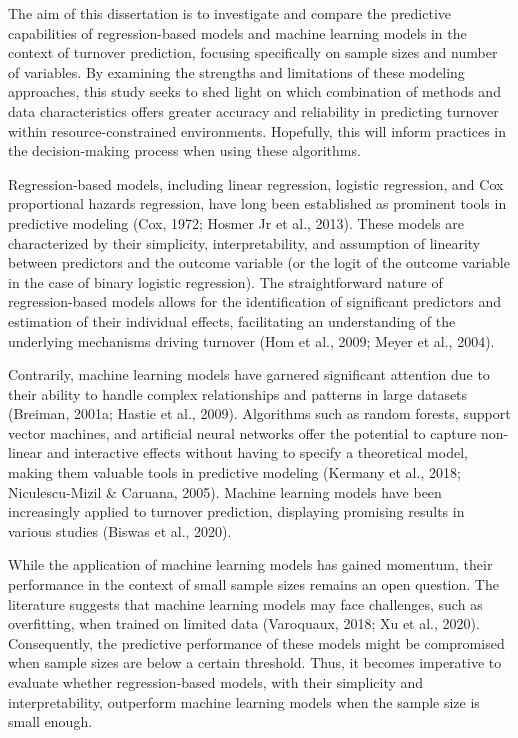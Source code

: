 \documentclass[
  man]{apa7}
\begin{document}
The aim of this dissertation is to investigate and compare the predictive capabilities of regression-based models and machine learning models in the context of turnover prediction, focusing specifically on sample sizes and number of variables.
By examining the strengths and limitations of these modeling approaches, this study seeks to shed light on which combination of methods and data characteristics offers greater accuracy and reliability in predicting turnover within resource-constrained environments. Hopefully, this will inform practices in the decision-making process when using these algorithms.

Regression-based models, including linear regression, logistic regression, and Cox proportional hazards regression, have long been established as prominent tools in predictive modeling (Cox, 1972; Hosmer Jr et al., 2013).
These models are characterized by their simplicity, interpretability, and assumption of linearity between predictors and the outcome variable (or the logit of the outcome variable in the case of binary logistic regression).
The straightforward nature of regression-based models allows for the identification of significant predictors and estimation of their individual effects, facilitating an understanding of the underlying mechanisms driving turnover (Hom et al., 2009; Meyer et al., 2004).

Contrarily, machine learning models have garnered significant attention due to their ability to handle complex relationships and patterns in large datasets (Breiman, 2001a; Hastie et al., 2009).
Algorithms such as random forests, support vector machines, and artificial neural networks offer the potential to capture non-linear and interactive effects without having to specify a theoretical model, making them valuable tools in predictive modeling (Kermany et al., 2018; Niculescu-Mizil \& Caruana, 2005).
Machine learning models have been increasingly applied to turnover prediction, displaying promising results in various studies (Biswas et al., 2020).

While the application of machine learning models has gained momentum, their performance in the context of small sample sizes remains an open question.
The literature suggests that machine learning models may face challenges, such as overfitting, when trained on limited data (Varoquaux, 2018; Xu et al., 2020).
Consequently, the predictive performance of these models might be compromised when sample sizes are below a certain threshold.
Thus, it becomes imperative to evaluate whether regression-based models, with their simplicity and interpretability, outperform machine learning models when the sample size is small enough.
\end{document}
